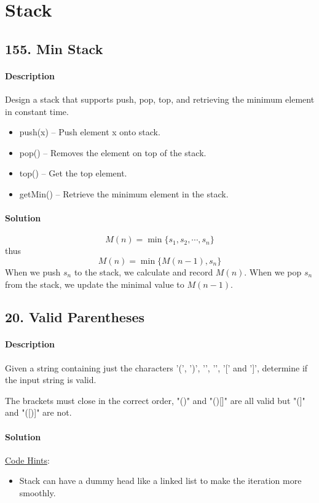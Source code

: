 \section{Stack}

\subsection{155. Min Stack}

\paragraph{\color{white} \colorbox{Mahogany}{Description}}
Design a stack that supports push, pop, top, and retrieving the minimum element in constant time.
\begin{itemize}
    \item push(x) -- Push element x onto stack.
    \item pop() -- Removes the element on top of the stack.
    \item top() -- Get the top element.
    \item getMin() -- Retrieve the minimum element in the stack. 
\end{itemize}

\paragraph{\color{white} \colorbox{OliveGreen}{Solution}}
$$M(n)=\min\{s_1,s_2,\cdots,s_n\}$$
thus
$$M(n)=\min\{M(n-1), s_n\}$$
When we push $s_n$ to the stack, we calculate and record $M(n)$. When we pop $s_n$ from the stack, we update the minimal value to $M(n-1)$.

\subsection{20. Valid Parentheses}

\paragraph{\color{white} \colorbox{Mahogany}{Description}}
Given a string containing just the characters '(', ')', '{', '}', '[' and ']', determine if the input string is valid.

The brackets must close in the correct order, "()" and "()[]{}" are all valid but "(]" and "([)]" are not.

\paragraph{\color{white} \colorbox{OliveGreen}{Solution}}
\underline{Code Hints}:
\begin{itemize}
    \item Stack can have a dummy head like a linked list to make the iteration more smoothly.
\end{itemize}

